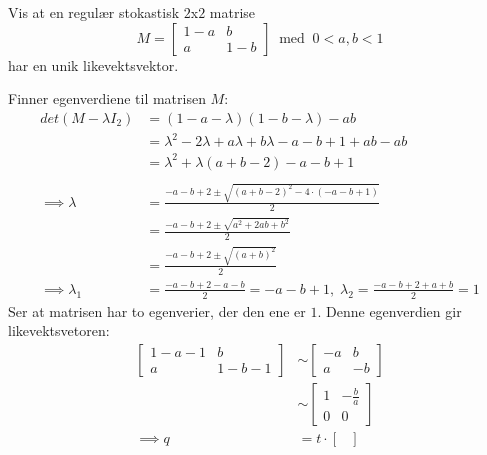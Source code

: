 \documentclass[11pt, a4paper, norsk]{NTNUoving}
\begin{document}
   \begin{oppgave}
       Vis at en regulær stokastisk $2$x$2$ matrise \[ M = \begin{bmatrix}
           1-a & b \\
           a & 1-b
       \end{bmatrix} \; \; \text{med} \; \; 0 < a,b < 1\] har en unik likevektsvektor.

       Finner egenverdiene til matrisen $M$:
       \begin{align*}
           det(M - \lambda I_2) &= (1-a-\lambda)(1-b-\lambda)-ab
           \\
                                &= \lambda^2 - 2\lambda + a\lambda + b\lambda - a - b + 1 + ab - ab
                                \\
                                &= \lambda^2 + \lambda(a+b-2) - a - b + 1
                                \\
                                \\
           \implies \lambda &= \frac{-a-b+2 \pm \sqrt{(a+b-2)^2 - 4 \cdot (-a-b+1)}}{2}
           \\
                            &= \frac{-a-b+2 \pm \sqrt{a^2 + 2ab + b^2}}{2} 
                            \\
                            &= \frac{-a-b+2 \pm \sqrt{(a+b)^2}}{2}
                            \\
           \implies \lambda_1 &= \frac{-a-b+2-a-b}{2} = -a-b+1, \; \lambda_2 = \frac{-a-b+2+a+b}{2} = 1
       \end{align*}
       Ser at matrisen har to egenverier, der den ene er $1$. Denne egenverdien gir likevektsvetoren:
       \begin{align*}
           \begin{bmatrix}
               1-a-1 & b \\
               a & 1-b-1
           \end{bmatrix} &\sim \begin{bmatrix}
           -a & b \\
            a & -b
           \end{bmatrix}
           \\
           &\sim \begin{bmatrix}
               1 & -\frac{b}{a}\\
               0 & 0
           \end{bmatrix}
           \\
           \implies q &= t\cdot \begin{bmatrix}

\end{bmatrix}
\end{align*}
\end{oppgave}
\end{document}
